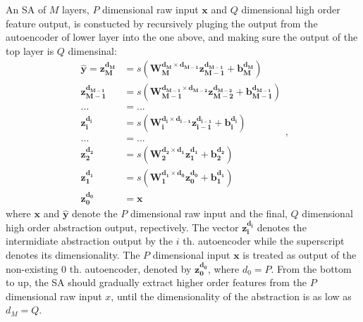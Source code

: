 An SA of $M$ layers, $P$ dimensional raw input $\boldsymbol{x}$ and $Q$ dimensional high order feature output, is constucted by recursively pluging the output from the autoencoder of lower layer into the one above, and making sure the output of the top layer is $Q$ dimensinal:
\begin{equation} \label{eq:MLP}
  \begin{split}
    \boldsymbol{\hat{y}}=
    \boldsymbol{z_{M  }^{d_{M  }}}         &= s(\boldsymbol{W_{M  }^{d_{M  } \times d_{M-1}}z_{M-1}^{d_{M-1}}}+\boldsymbol{b_{M  }^{d_{M  }}}) \\
    \boldsymbol{z_{M-1}^{d_{M-1}}}         &= s(\boldsymbol{W_{M-1}^{d_{M-1} \times d_{M-2}}z_{M-2}^{d_{M-2}}}+\boldsymbol{b_{M-1}^{d_{M-1}}}) \\
    ... &= ... \\
    \boldsymbol{z_{i  }^{d_{i  }}}         &= s(\boldsymbol{W_{i  }^{d_{i  } \times d_{i-1}}z_{i-1}^{d_{i-1}}}+\boldsymbol{b_{i  }^{d_{i  }}}) \\
    ... &= ... \\
    \boldsymbol{z_{2  }^{d_{2  }}}         &= s(\boldsymbol{W_{2  }^{d_{2  } \times d_{1  }}z_{1  }^{d_{1  }}}+\boldsymbol{b_{2  }^{d_{2  }}}) \\
    \boldsymbol{z_{1  }^{d_{1  }}}         &= s(\boldsymbol{W_{1  }^{d_{1  } \times d_{0  }}z_{0  }^{d_{0  }}}+\boldsymbol{b_{1  }^{d_{1  }}}) \\
    \boldsymbol{z_{0  }^{d_{0  }}}         &= \boldsymbol{x}
  \end{split},
\end{equation}
where $\boldsymbol{x}$ and $\boldsymbol{\hat{y}}$ denote the $P$ dimensional raw input and the final, $Q$ dimensional high order abstraction output, repectively. The vector $\boldsymbol{z_i^{d_i}}$ denotes the intermidiate abstraction output by the $i$ th. autoencoder while the superscript denotes its dimensionality. The $P$ dimensional input $\boldsymbol{x}$ is treated as output of the non-existing $0$ th. autoencoder, denoted by $\boldsymbol{z_0^{d_0}}$, where $d_0=P$. From the bottom to up, the SA should gradually extract higher order features from the $P$ dimensional raw input $x$, until the dimensionality of the abstraction is as low as $d_M=Q$.

